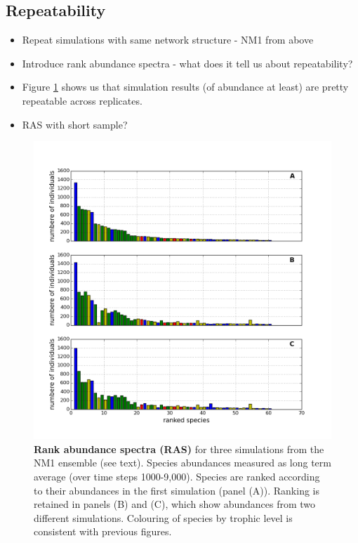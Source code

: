 


\subsection{Repeatability}

\begin{itemize}
	\item Repeat simulations with same network structure - NM1 from above
	\item Introduce rank abundance spectra - what does it tell us about repeatability?
	\item Figure \ref{fig:ras_3examples} shows us that simulation results (of abundance at least) are pretty repeatable across replicates.
	\item RAS with short sample?
\end{itemize}


\begin{figure}[hp]
	\centering
	\includegraphics[width=1.0\linewidth]{"./chapters/chapter04b/figures/ras_3examples"}
    \caption{\textbf{Rank abundance spectra (RAS)} for three simulations from the NM1 ensemble (see text). Species abundances measured as long term average (over time steps 1000-9,000). Species are ranked according to their abundances in the first simulation (panel (A)). Ranking is retained in panels (B) and (C), which show abundances from two different simulations. Colouring of species by trophic level is consistent with previous figures.}    
    \label{fig:ras_3examples}
\end{figure}

